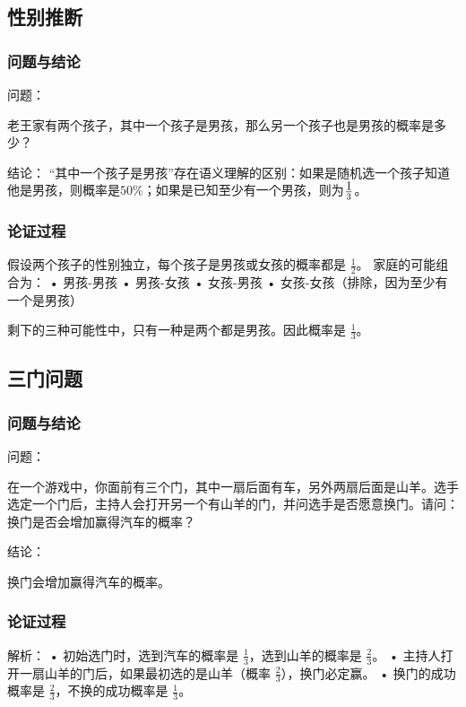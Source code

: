 \subsection{性别推断}

\subsubsection{问题与结论}

问题：

老王家有两个孩子，其中一个孩子是男孩，那么另一个孩子也是男孩的概率是多少？

结论：
“其中一个孩子是男孩”存在语义理解的区别：如果是随机选一个孩子知道他是男孩，则概率是$50\%$；如果是已知至少有一个男孩，则为$\displaystyle 1\over 3$。

\subsubsection{论证过程}
假设两个孩子的性别独立，每个孩子是男孩或女孩的概率都是 $\frac{1}{2}$。
家庭的可能组合为：
	•	男孩-男孩
	•	男孩-女孩
	•	女孩-男孩
	•	女孩-女孩（排除，因为至少有一个是男孩）

剩下的三种可能性中，只有一种是两个都是男孩。因此概率是 $\frac{1}{3}$。

\subsection{三门问题}

\subsubsection{问题与结论}

问题：

在一个游戏中，你面前有三个门，其中一扇后面有车，另外两扇后面是山羊。选手选定一个门后，主持人会打开另一个有山羊的门，并问选手是否愿意换门。请问：换门是否会增加赢得汽车的概率？

结论：

换门会增加赢得汽车的概率。

\subsubsection{论证过程}


解析：
	•	初始选门时，选到汽车的概率是 $\frac{1}{3}$，选到山羊的概率是 $\frac{2}{3}$。
	•	主持人打开一扇山羊的门后，如果最初选的是山羊（概率 $\frac{2}{3}$），换门必定赢。
	•	换门的成功概率是 $\frac{2}{3}$，不换的成功概率是 $\frac{1}{3}$。

